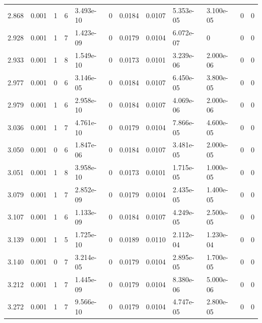 \documentclass[preview]{standalone}
\begin{document}
{{{\begin{tabular}{L{1.2cm}C{1.2cm} C{0.3cm}C{0.5cm} C{1.4cm}C{1.4cm} C{1.4cm}C{1.4cm} C{1.6cm}C{1.6cm} C{1.6cm}C{1.6cm}}
  2.868  &  0.001  & 1     &  6 &  3.493e-10  & 0  &  0.0184&   0.0107& 5.353e-05 & 3.100e-05   &  0 & 0  \\ 
  2.928  &  0.001  & 1     &  7 &  1.423e-09  & 0  &  0.0179&   0.0104& 6.072e-07 & 0   &  0 & 0  \\ 
  2.933  &  0.001  & 1     &  8 &  1.549e-10  & 0  &  0.0173&   0.0101& 3.239e-06 & 2.000e-06   &  0 & 0  \\ 
  2.977  &  0.001  & 0     &  6 &  3.146e-05  & 0  &  0.0184&   0.0107& 6.450e-05 & 3.800e-05   &  0 & 0  \\ 
  2.979  &  0.001  & 1     &  6 &  2.958e-10  & 0  &  0.0184&   0.0107& 4.069e-06 & 2.000e-06   &  0 & 0  \\ 
  3.036  &  0.001  & 1     &  7 &  4.761e-10  & 0  &  0.0179&   0.0104& 7.866e-05 & 4.600e-05   &  0 & 0  \\ 
  3.050  &  0.001  & 0     &  6 &  1.847e-06  & 0  &  0.0184&   0.0107& 3.481e-05 & 2.000e-05   &  0 & 0  \\ 
  3.051  &  0.001  & 1     &  8 &  3.958e-10  & 0  &  0.0173&   0.0101& 1.715e-05 & 1.000e-05   &  0 & 0  \\ 
  3.079  &  0.001  & 1     &  7 &  2.852e-09  & 0  &  0.0179&   0.0104& 2.435e-05 & 1.400e-05   &  0 & 0  \\ 
  3.107  &  0.001  & 1     &  6 &  1.133e-09  & 0  &  0.0184&   0.0107& 4.249e-05 & 2.500e-05   &  0 & 0  \\ 
  3.139  &  0.001  & 1     &  5 &  1.725e-10  & 0  &  0.0189&   0.0110& 2.112e-04 & 1.230e-04   &  0 & 0  \\ 
  3.140  &  0.001  & 0     &  7 &  3.214e-05  & 0  &  0.0179&   0.0104& 2.895e-05 & 1.700e-05   &  0 & 0  \\ 
  3.212  &  0.001  & 1     &  7 &  1.445e-09  & 0  &  0.0179&   0.0104& 8.380e-06 & 5.000e-06   &  0 & 0  \\ 
  3.272  &  0.001  & 1     &  7 &  9.566e-10  & 0  &  0.0179&   0.0104& 4.747e-05 & 2.800e-05   &  0 & 0  \\ 
\hline 
\end{tabular} 

}}}
\end{document}
